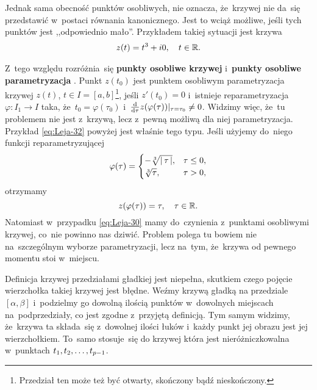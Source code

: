 \documentclass[a4paper,11pt]{article}
\begin{document}
Jednak sama obecność punktów osobliwych, nie oznacza, że~krzywej nie
da~się przedstawić w~postaci równania kanonicznego. Jest to wciąż
możliwe, jeśli tych punktów jest ,,odpowiednio mało''. Przykładem
takiej sytuacji jest krzywa
\begin{equation}
  \label{eq:Leja-32}
  \begin{split}
    z( t ) = t^{ 3 } + i 0, \quad t \in \mathbb{R}.
  \end{split}
\end{equation}

Z~tego względu rozróżnia~się \textbf{punkty osobliwe krzywej}
i~\textbf{punkty osobliwe parametryzacja}
\cite{GdowskiElementGeometriiRozniczkowejZZadaniami1999}. Punkt
$z( t_{ 0 } )$ jest punktem osobliwym parametryzacja krzywej $z( t )$,
$t \in I = [ a, b ]$\footnote{Przedział ten może też być otwarty,
  skończony bądź nieskończony.}, jeśli $z'( t_{ 0 } ) = 0$ i~istnieje
reparametryzacja $\varphi: I_{ 1 } \to I$ taka,
że~$t_{ 0 } = \varphi( \tau_{ 0 } )$
i~$\tfrac{ \mathrm{d} }{ \mathrm{d} \tau } z( \varphi( \tau ) )|_{ \tau = \tau_{ 0 }
} \neq 0$. Widzimy więc, że~tu problemem nie jest z~krzywą, lecz
z~pewną możliwą dla niej parametryzacja. Przykład \eqref{eq:Leja-32}
powyżej jest właśnie tego typu. Jeśli użyjemy do~niego funkcji
reparametryzującej
\begin{equation}
  \label{eq:Leja-33}
  \varphi( \tau ) =
  \begin{cases}
    -\sqrt[3]{ \left| \,  \tau  \, \right| }, & \tau \leq 0, \\
    \sqrt[3]{ \tau }, & \tau > 0,
  \end{cases}
\end{equation}
otrzymamy
\begin{equation}
  \label{eq:Leja-34}
  z( \varphi( \tau ) ) = \tau, \quad \tau \in \mathbb{R}.
\end{equation}
Natomiast w~przypadku \eqref{eq:Leja-30} mamy do~czynienia z~punktami
osobliwymi krzywej, co~nie powinno nas dziwić. Problem polega tu
bowiem nie na~szczególnym wyborze parametryzacji, lecz na~tym,
że~krzywa od pewnego momentu stoi w~miejscu.

\vspace{\spaceFour}


\start {} Definicja krzywej przedziałami gładkiej jest
niepełna, skutkiem czego pojęcie wierzchołka takiej krzywej jest
błędne. Weźmy krzywą gładką na przedziale $[ \alpha, \beta ]$ i~podzielmy
go dowolną ilością punktów w~dowolnych miejscach na~podprzedziały, co
jest zgodne z~przyjętą definicją. Tym samym widzimy, że~krzywa ta
składa~się z~dowolnej ilości łuków i~każdy punkt jej obrazu jest jej
wierzchołkiem. To~samo stosuje~się do krzywej która jest
nieróżniczkowalna w~punktach $t_{ 1 }, t_{ 2 }, \ldots, t_{ p - 1 }$.
\end{document}
